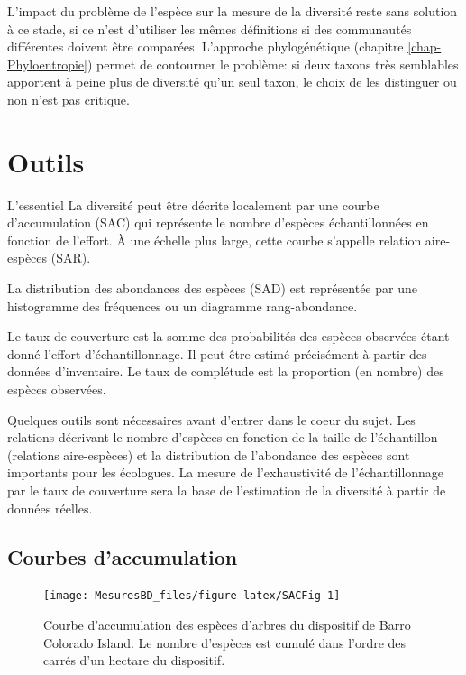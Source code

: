 \documentclass[
  11pt,
  french,
  a4paper,
  extrafontsizes,onecolumn,openright
  ]{memoir}
\newenvironment{Summary}
  {\begin{bclogo}[logo=\bctrombone, noborder=true, couleur=lightgray!50]{L'essentiel}\parindent0pt}
  {\end{bclogo}}
\begin{document}
L'impact du problème de l'espèce sur la mesure de la diversité reste sans solution à ce stade, si ce n'est d'utiliser les mêmes définitions si des communautés différentes doivent être comparées.
L'approche phylogénétique (chapitre \ref{chap-Phyloentropie}) permet de contourner le problème: si deux taxons très semblables apportent à peine plus de diversité qu'un seul taxon, le choix de les distinguer ou non n'est pas critique.

\chapter{Outils}\label{chap-Outils}

\begin{Summary}
La diversité peut être décrite localement par une courbe d'accumulation (SAC) qui représente le nombre d'espèces échantillonnées en fonction de l'effort.
À une échelle plus large, cette courbe s'appelle relation aire-espèces (SAR).

La distribution des abondances des espèces (SAD) est représentée par une histogramme des fréquences ou un diagramme rang-abondance.

Le taux de couverture est la somme des probabilités des espèces observées étant donné l'effort d'échantillonnage.
Il peut être estimé précisément à partir des données d'inventaire.
Le taux de complétude est la proportion (en nombre) des espèces observées.

\end{Summary}

Quelques outils sont nécessaires avant d'entrer dans le coeur du sujet.
Les relations décrivant le nombre d'espèces en fonction de la taille de l'échantillon (relations aire-espèces) et la distribution de l'abondance des espèces sont importants pour les écologues.
La mesure de l'exhaustivité de l'échantillonnage par le taux de couverture sera la base de l'estimation de la diversité à partir de données réelles.

\section{Courbes d'accumulation}\label{courbes-daccumulation}



\scriptsize

\begin{figure}

{\centering \texttt{[image: MesuresBD\_files/figure-latex/SACFig-1]} 

}

\caption{Courbe d'accumulation des espèces d'arbres du dispositif de Barro Colorado Island. Le nombre d'espèces est cumulé dans l'ordre des carrés d'un hectare du dispositif.}\label{fig:SACFig}
\end{figure}
\end{document}
